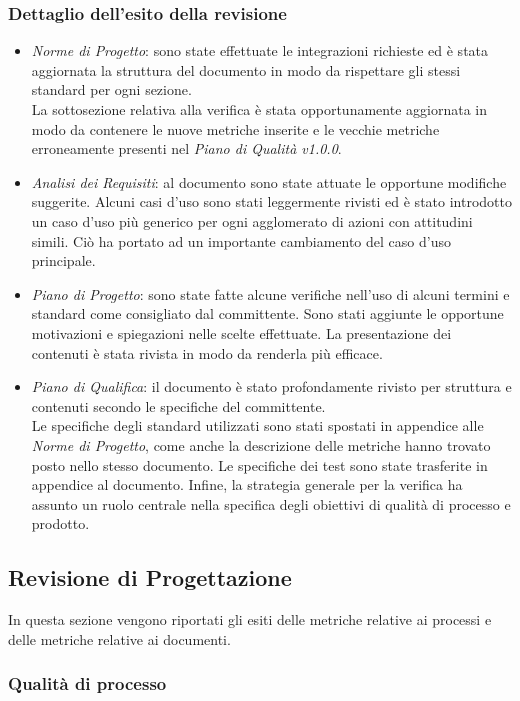 \subsubsection{Dettaglio dell'esito della revisione}
\begin{itemize}
	\item\emph{Norme di Progetto}: sono state effettuate le integrazioni richieste ed è stata aggiornata la struttura del documento in modo da rispettare gli stessi standard per ogni sezione.\\
	La sottosezione relativa alla verifica è stata opportunamente aggiornata in modo da contenere le nuove metriche inserite e le vecchie metriche erroneamente presenti nel \emph{Piano di Qualità v1.0.0}.	\item\emph{Analisi dei Requisiti}: al documento sono state attuate le opportune modifiche suggerite. Alcuni casi d'uso sono stati leggermente rivisti ed è stato introdotto un caso d'uso più generico per ogni agglomerato di azioni con attitudini simili. Ciò ha portato ad un importante cambiamento del caso d'uso principale. 	
	\item\emph{Piano di Progetto}: sono state fatte alcune verifiche nell'uso di alcuni termini e standard come consigliato dal committente. Sono stati aggiunte le opportune motivazioni e spiegazioni nelle scelte effettuate. La presentazione dei contenuti è stata rivista in modo da renderla più efficace.
	\item\emph{Piano di Qualifica}: il documento è stato profondamente rivisto per struttura e contenuti secondo le specifiche del committente. \\
	Le specifiche degli standard utilizzati sono stati spostati in appendice alle \emph{Norme di Progetto}, come anche la descrizione delle metriche hanno trovato posto nello stesso documento. Le specifiche dei test sono state trasferite in appendice al documento. Infine, la strategia generale per la verifica ha assunto un ruolo centrale nella specifica degli obiettivi di qualità di processo e prodotto. 
\end{itemize}
\pagebreak

\subsection{Revisione di Progettazione}
In questa sezione vengono riportati gli esiti delle metriche relative ai processi e delle metriche relative ai documenti.
\subsubsection{Qualità di processo}

